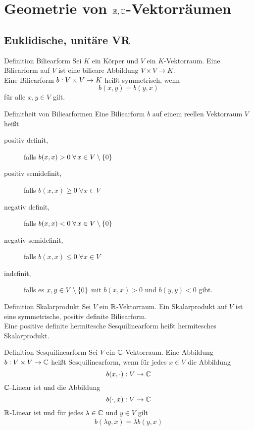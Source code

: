\documentclass[main.tex]{subfiles}
\begin{document}
\section*{Geometrie von \(\mathbb{R}, \mathbb{C}\)-Vektorräumen}
\subsection*{Euklidische, unitäre VR}

\begin{karte}{Definition Biliearform}
     Sei \(K\) ein Körper und \(V\) ein \(K\)-Vektorraum. Eine
     Biliearform auf \(V\) ist eine bilieare Abbildung 
     \(V \times V \rightarrow K\).\\
     Eine Biliearform \(b : V\times V \rightarrow K\) heißt symmetrisch,
     wenn
     \[ b(x,y) = b(y,x) \]
     für alle \(x, y \in V \) gilt.
\end{karte}

\begin{karte}{Definitheit von Biliearformen}
     Eine Biliearform \(b\) auf einem reellen Vektorraum \(V\) heißt
     \begin{description}
         \item[positiv definit,] falls \(b(x,x) > 0 \; \forall x \in V \setminus \set{0}\)
         \item[positiv semidefinit,] falls \(b(x,x) \geq 0 \; \forall x \in V\)
         \item[negativ definit,] falls \(b(x,x) < 0 \; \forall x \in V \setminus \set{0}\)
         \item[negativ semidefinit,] falls \(b(x,x) \leq 0 \; \forall x \in V\)
         \item[indefinit,] falls es \(x, y \in V \setminus \{0\}\) mit
         \(b(x,x) > 0\) und \(b(y,y) < 0\) gibt.  
     \end{description}
\end{karte}

\begin{karte}{Definition Skalarprodukt}
    Sei \(V\) ein \(\mathbb{R}\)-Vektorraum. Ein Skalarprodukt auf \(V\) ist eine
    symmetrische, positiv definite Biliearform.\\
    Eine positive definite hermitesche Sesquilinearform heißt hermitesches Skalarprodukt.
\end{karte}

\begin{karte}{Definition Sesquilinearform}
    Sei \(V\) ein \(\mathbb{C}\)-Vektorraum. Eine Abbildung \(b : V\times V \rightarrow \mathbb{C}\)
    heißt Sesquilinearform, wenn für jedes \(x\in V\) die Abbildung
    \[ b(x, \cdot) : V \rightarrow \mathbb{C} \]
    \(\mathbb{C}\)-Linear ist und die Abbildung
    \[ b(\cdot, x) : V \rightarrow \mathbb{C} \]
    \(\mathbb{R}\)-Linear ist und für jedes \(\lambda \in \mathbb{C}\) und \(y \in V\) gilt
    \[ b(\lambda y, x) = \overline{\lambda} b(y,x) \]
\end{karte}
\end{document}
